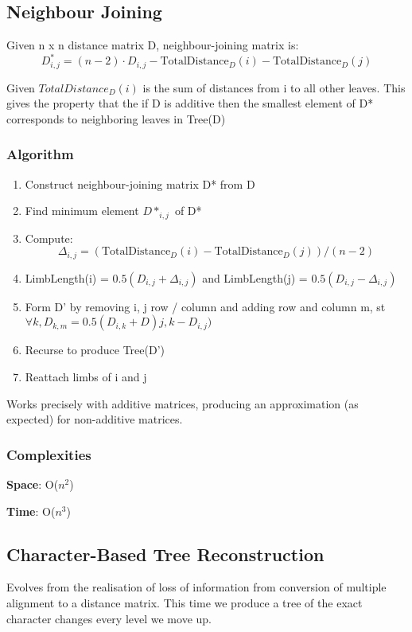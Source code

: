 \documentclass{article}
\begin{document}
\subsection{Neighbour Joining}
Given n x n distance matrix D, neighbour-joining matrix is:
$$
D_{i, j}^{*}=(n-2) \cdot D_{i, j}-\text {TotalDistance}_{D}(i)-\text {TotalDistance}_{D}(j)
$$

Given $TotalDistance_{D}(i)$ is the sum of distances from i to all other leaves. This gives the property that the if D is additive then the smallest element of D* corresponds to neighboring leaves in Tree(D)

\subsubsection{Algorithm}
\begin{enumerate}
    \item Construct neighbour-joining matrix D* from D
    \item Find minimum element $D*_{i, j}$ of D*
    \item Compute:
    $$\Delta_{i, j}=(\text {TotalDistance}_{D}(i)- \text {TotalDistance}_{D}(j)) /(n-2)$$
    \item LimbLength(i) = $0.5 (D_{i, j} + \Delta _{i, j})$ and LimbLength(j) = $0.5 (D_{i, j} - \Delta _{i, j})$
    \item Form D' by removing i, j row / column and adding row and column m, st $\forall k, D_{k, m} = 0.5 (D_{i, k} + D){j, k} - D_{i, j})$
    \item Recurse to produce Tree(D')
    \item Reattach limbs of i and j
\end{enumerate}

Works precisely with additive matrices, producing an approximation (as expected) for non-additive matrices.

\subsubsection{Complexities}
\textbf{Space}: O($n^{2}$)

\noindent
\textbf{Time}: O($n^{3}$)


\subsection{Character-Based Tree Reconstruction}
Evolves from the realisation of loss of information from conversion of multiple alignment to a distance matrix. This time we produce a tree of the exact character changes every level we move up.
\end{document}
